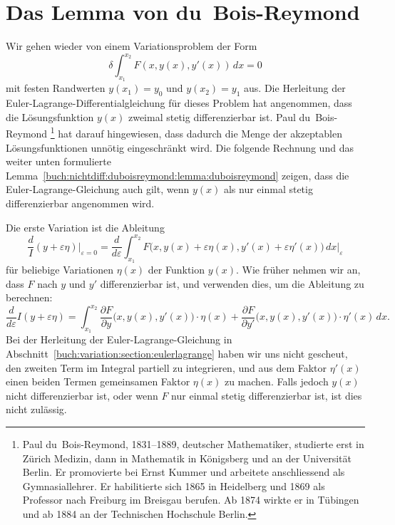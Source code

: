 %
%
%
\section{Das Lemma von du~Bois-Reymond
\label{buch:nichtdiff:section:duboisreymond}}
Wir gehen wieder von einem Variationsproblem der Form
\begin{equation}
\delta
\int_{x_1}^{x_2}
F(x,y(x),y'(x))\,dx
=
0
\label{buch:nichtdiff:duboisreymond:eqn:problem}
\end{equation}
mit festen Randwerten $y(x_1)=y_0$ und $y(x_2)=y_1$ aus.
Die Herleitung der Euler-Lagrange-Differentialgleichung für dieses
Problem hat angenommen, dass die Lösungsfunktion $y(x)$ zweimal
stetig differenzierbar ist.
Paul du~Bois-Reymond%
\footnote{Paul du~Bois-Reymond, 1831--1889, deutscher
Mathematiker, studierte erst in Zürich Medizin, dann in Mathematik
in Königsberg und an der Universität Berlin.
Er promovierte bei Ernst Kummer und arbeitete anschliessend als
Gymnasiallehrer.
Er habilitierte sich 1865 in Heidelberg und 1869 als Professor nach
Freiburg im  Breisgau berufen.
Ab 1874 wirkte er in Tübingen und ab 1884 an der
Technischen Hochschule Berlin.}
hat darauf hingewiesen, dass dadurch die Menge der akzeptablen
Lösungsfunktionen unnötig eingeschränkt wird.
Die folgende Rechnung und das weiter unten formulierte 
Lemma~\ref{buch:nichtdiff:duboisreymond:lemma:duboisreymond}
zeigen, dass die Euler-Lagrange-Gleichung auch gilt, wenn $y(x)$
als nur einmal stetig differenzierbar angenommen wird.

Die erste Variation ist die Ableitung
\[
\frac{d}I(y+\varepsilon\eta)\bigg|_{\varepsilon=0}
=
\frac{d}{d\varepsilon}
\int_{x_1}^{x_2}
F\bigl(x,y(x)+\varepsilon\eta(x), y'(x)+\varepsilon\eta'(x)\bigr)\,dx
\bigg|_{\varepsilon}
\]
für beliebige Variationen $\eta(x)$ der Funktion $y(x)$.
Wie früher nehmen wir an, dass $F$ nach $y$ und $y'$ differenzierbar
ist, und verwenden dies, um die Ableitung zu berechnen:
\begin{equation}
\frac{d}{d\varepsilon}I(y+\varepsilon\eta)
=
\int_{x_1}^{x_2}
\frac{\partial F}{\partial y}\bigl(x,y(x),y'(x)\bigr)\cdot \eta(x)
+
\frac{\partial F}{\partial y'}\bigl(x,y(x),y'(x)\bigr)\cdot \eta'(x)
\,dx.
\label{nichtdiff:duboisreymon:eqn:ableitung}
\end{equation}
Bei der Herleitung der Euler-Lagrange-Gleichung in
Abschnitt~\ref{buch:variation:section:eulerlagrange}
haben wir uns nicht gescheut, den zweiten Term im Integral
partiell zu integrieren, und aus dem Faktor $\eta'(x)$ einen
beiden Termen gemeinsamen Faktor $\eta(x)$ zu machen.
Falls jedoch $y(x)$ nicht differenzierbar ist, oder wenn $F$ nur
einmal stetig differenzierbar ist, ist dies nicht zulässig.

